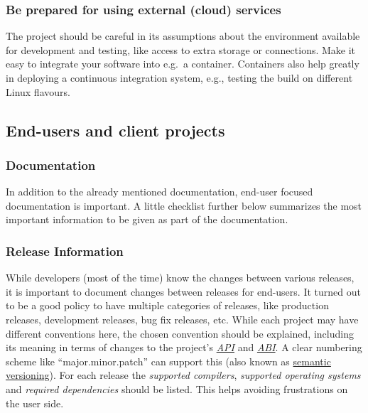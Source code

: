 \documentclass[12pt,a4paper]{article}
\begin{document}
\subsubsection{Be prepared for using external (cloud)
services}\label{be-prepared-for-using-external-cloud-services}

The project should be careful in its assumptions about the environment
available for development and testing, like access to extra storage or
connections. Make it easy to integrate your software into e.g.~a
container. Containers also help greatly in deploying a continuous
integration system, e.g., testing the build on different Linux flavours.

\subsection{End-users and client
projects}\label{end-users-and-client-projects}

\subsubsection{Documentation}\label{documentation}

In addition to the already mentioned documentation, end-user focused
documentation is important. A little checklist further below summarizes
the most important information to be given as part of the documentation.

\subsubsection{Release Information}\label{release-information}

While developers (most of the time) know the changes between various
releases, it is important to document changes between releases for
end-users. It turned out to be a good policy to have multiple categories
of releases, like production releases, development releases, bug fix
releases, etc. While each project may have different conventions here,
the chosen convention should be explained, including its meaning in
terms of changes to the project's
\href{https://en.wikipedia.org/wiki/Application_programming_interface}{\emph{API}}
and
\href{https://en.wikipedia.org/wiki/Application_binary_interface}{\emph{ABI}}.
A clear numbering scheme like ``major.minor.patch'' can support this
(also known as \href{https://semver.org/}{semantic versioning}). For
each release the \emph{supported compilers}, \emph{supported operating
systems} and \emph{required dependencies} should be listed. This helps
avoiding frustrations on the user side.
\end{document}
